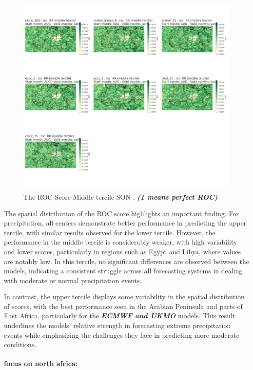 \begin{figure}[H]
    \centering
    \includegraphics[scale=0.3]{plots/prob/roc/roc_son_RR_middle.png}
    \caption{The ROC Score Middle tercile SON    . \textbf{\textit{(1 means perfect ROC)}}}
\end{figure}

The spatial distribution of the ROC score highlights an important finding. For precipitation, all centers demonstrate better performance in predicting the upper tercile, with similar results observed for the lower tercile. However, the performance in the middle tercile is considerably weaker, with high variability and lower scores, particularly in regions such as Egypt and Libya, where values are notably low. In this tercile, no significant differences are observed between the models, indicating a consistent struggle across all forecasting systems in dealing with moderate or normal precipitation events.

In contrast, the upper tercile displays some variability in the spatial distribution of scores, with the best performance seen in the Arabian Peninsula and parts of East Africa, particularly for the \textbf{\textit{ECMWF and UKMO}} models. This result underlines the models' relative strength in forecasting extreme precipitation events while emphasizing the challenges they face in predicting more moderate conditions.

				\paragraph{focus on north africa:}

